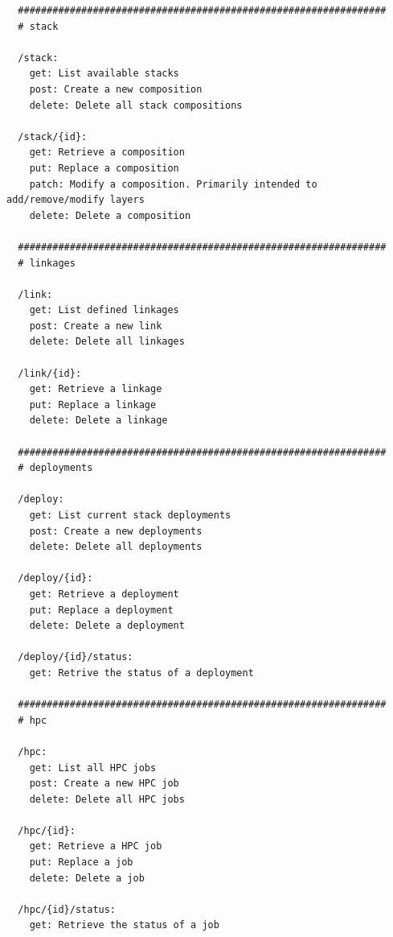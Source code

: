 \documentclass[11pt]{article}
\begin{document}
\begin{verbatim}
  ################################################################
  # stack

  /stack:
    get: List available stacks
    post: Create a new composition
    delete: Delete all stack compositions

  /stack/{id}:
    get: Retrieve a composition
    put: Replace a composition
    patch: Modify a composition. Primarily intended to add/remove/modify layers
    delete: Delete a composition

  ################################################################
  # linkages

  /link:
    get: List defined linkages
    post: Create a new link
    delete: Delete all linkages

  /link/{id}:
    get: Retrieve a linkage
    put: Replace a linkage
    delete: Delete a linkage

  ################################################################
  # deployments

  /deploy:
    get: List current stack deployments
    post: Create a new deployments
    delete: Delete all deployments

  /deploy/{id}:
    get: Retrieve a deployment
    put: Replace a deployment
    delete: Delete a deployment

  /deploy/{id}/status:
    get: Retrive the status of a deployment

  ################################################################
  # hpc

  /hpc:
    get: List all HPC jobs
    post: Create a new HPC job
    delete: Delete all HPC jobs

  /hpc/{id}:
    get: Retrieve a HPC job
    put: Replace a job
    delete: Delete a job

  /hpc/{id}/status:
    get: Retrieve the status of a job
\end{verbatim}


 
\end{document}
